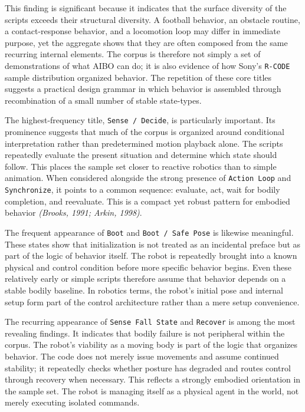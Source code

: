 \documentclass[11pt]{article}
\begin{document}
This finding is significant because it indicates that the surface
diversity of the scripts exceeds their structural diversity. A football
behavior, an obstacle routine, a contact-response behavior, and a
locomotion loop may differ in immediate purpose, yet the aggregate
shows that they are often composed from the same recurring internal
elements. The corpus is therefore not simply a set of demonstrations of
what AIBO can do; it is also evidence of how Sony's \texttt{R-CODE}
sample distribution organized behavior. The repetition of these core
titles suggests a practical design grammar in which behavior is
assembled through recombination of a small number of stable
state-types.

The highest-frequency title, \texttt{Sense / Decide}, is particularly
important. Its prominence suggests that much of the corpus is organized
around conditional interpretation rather than predetermined motion
playback alone. The scripts repeatedly evaluate the present situation
and determine which state should follow. This places the sample set
closer to reactive robotics than to simple animation. When considered
alongside the strong presence of \texttt{Action Loop} and
\texttt{Synchronize}, it points to a common sequence: evaluate, act,
wait for bodily completion, and reevaluate. This is a compact yet
robust pattern for embodied behavior \textit{(Brooks, 1991; Arkin, 1998)}.

The frequent appearance of \texttt{Boot} and \texttt{Boot / Safe Pose}
is likewise meaningful. These states show that initialization is not
treated as an incidental preface but as part of the logic of behavior
itself. The robot is repeatedly brought into a known physical and
control condition before more specific behavior begins. Even these
relatively early or simple scripts therefore assume that behavior
depends on a stable bodily baseline. In robotics terms, the robot's
initial pose and internal setup form part of the control architecture
rather than a mere setup convenience.

The recurring appearance of \texttt{Sense Fall State} and
\texttt{Recover} is among the most revealing findings. It indicates
that bodily failure is not peripheral within the corpus. The robot's
viability as a moving body is part of the logic that organizes
behavior. The code does not merely issue movements and assume continued
stability; it repeatedly checks whether posture has degraded and routes
control through recovery when necessary. This reflects a strongly
embodied orientation in the sample set. The robot is managing itself as
a physical agent in the world, not merely executing isolated commands.
\end{document}
